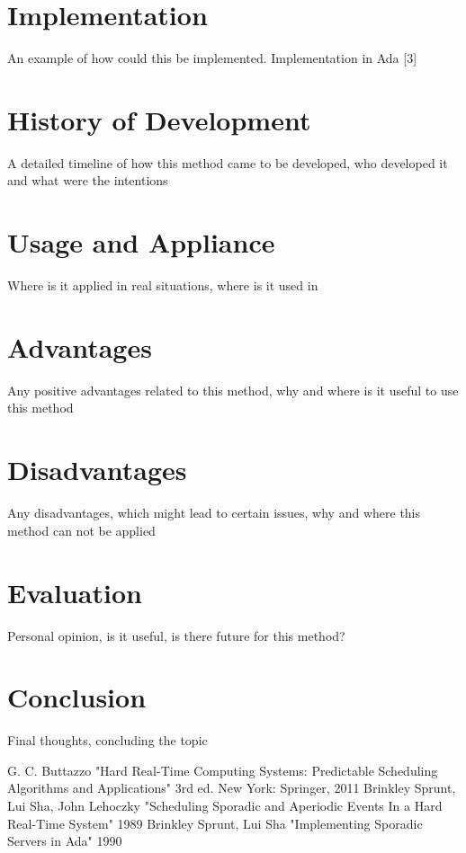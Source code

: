 \documentclass[conference]{IEEEtran}
\begin{document}
\section{Implementation}
An example of how could this be implemented. Implementation in  Ada [3]

\section{History of Development}
A detailed timeline of how this method came to be developed, who developed it and what were the intentions

\section{Usage and Appliance}
Where is it applied in real situations, where is it used in

\section{Advantages}
Any positive advantages related to this method, why and where is it useful to use this method

\section{Disadvantages}
Any disadvantages, which might lead to certain issues, why and where this method can not be applied

\section{Evaluation}
Personal opinion, is it useful, is there future for this method?

\section{Conclusion}
Final thoughts, concluding the topic

\begin{thebibliography}{00}
 G. C. Buttazzo "Hard Real-Time Computing Systems: Predictable Scheduling Algorithms and Applications" 3rd ed. New York: Springer, 2011
 Brinkley Sprunt, Lui Sha, John Lehoczky "Scheduling Sporadic and Aperiodic Events In a Hard Real-Time System" 1989
 Brinkley Sprunt, Lui Sha "Implementing Sporadic Servers in Ada" 1990
\end{thebibliography}
\end{document}
